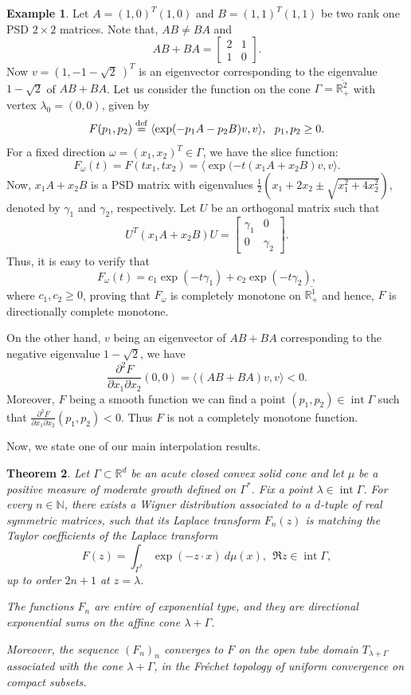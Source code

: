 \documentclass[11pt,reqno]{amsart}
\theoremstyle{plain}
\newtheorem{theorem}{Theorem}[section]
\theoremstyle{definition}
\newtheorem{example}[theorem]{Example}
\numberwithin{equation}{section}
\newcommand{\bydef}{\stackrel{\rm def}{=}}
\begin{document}
\begin{example} 
    Let $A=(1, 0)^T (1, 0)$ and $B=(1, 1)^T (1, 1)$ be two rank one PSD $2 \times 2$ matrices. Note that, $AB \neq BA$ and 
    $$AB+BA = \begin{bmatrix}
        2 & 1 \\ 1& 0
    \end{bmatrix}.$$ Now $v=(1, -1-\sqrt{2} \ )^T$ is an eigenvector corresponding to the eigenvalue $1-\sqrt{2}$ of $AB+BA$. Let us consider the function on the cone $\Gamma = \overline{\mathbb{R}^2_+}$ with vertex $\lambda_0 = (0, 0)$, given by
    $$
    F(p_1, p_2) \bydef \langle \exp(-p_1 A - p_2 B)v, v\rangle, \ \ p_1, p_2 \geq 0.
    $$
    For a fixed direction $\omega =(x_1, x_2)^T \in \Gamma$, we have the slice function:
$$
F_\omega(t) = F(t x_1, t x_2) = \langle \exp(-t(x_1 A + x_2 B)v, v\rangle.
$$
Now, $x_1A + x_2B$ is a PSD matrix with eigenvalues $\frac{1}{2}(x_1+ 2x_2 \pm \sqrt{x_1^2 + 4x_2^2})$, denoted by $\gamma_1$ and $\gamma_2$, respectively. Let $U$ be an orthogonal matrix such that 
$$U^T(x_1A + x_2B) U = \begin{bmatrix}
    \gamma_1 & 0\\ 0 & \gamma_2
\end{bmatrix}.$$
Thus, it is easy to verify that 
$$
F_\omega(t) = c_1 \exp(-t \gamma_1) + c_2 \exp(-t \gamma_2),
$$
where $c_1, c_2\geq 0$, proving that $F_\omega$ is completely monotone on $\overline{\mathbb{R}^1_+}$ and hence, $F$ is directionally complete monotone.

On the other hand, $v$ being an eigenvector of $AB+BA$ corresponding to the negative eigenvalue $1-\sqrt{2}$, we have
$$
\frac{\partial^2F}{\partial x_1 \partial x_2}(0, 0) =\langle (AB + BA)v, v \rangle < 0.
$$
Moreover, $F$ being a smooth function we can find a point $(p_1, p_2) \in \operatorname{int} \Gamma$ such that $\frac{\partial^2F}{\partial x_1 \partial x_2}(p_1, p_2) < 0.$ Thus $F$ is not a completely monotone function.
\end{example}

Now, we state one of our main interpolation results. 
	\begin{theorem}\label{th:Lap conv}
		Let $\Gamma \subset {\mathbb R}^d$ be an acute closed convex solid cone and let $\mu$ be a positive measure of moderate growth defined on $\Gamma^\ast$.
		Fix a point $\lambda \in \operatorname{int} \Gamma$. For every $n \in \mathbb{N}$, there exists a Wigner distribution associated 
		to a $d$-tuple of real symmetric matrices, such that its Laplace transform $F_n(z)$ is matching the Taylor coefficients of
		the Laplace transform
		$$ F(z) = \int_{\Gamma^\ast} \exp{(-z\cdot x)}\ d\mu(x), \ \ \Re z \in \operatorname{int} \Gamma,$$ 
        up to order $2n+1$ at $z = \lambda$. 
        
		The functions $F_n$ are entire of exponential type, and they are directional exponential sums on the affine cone $\lambda+\Gamma$. 
        
        Moreover, the sequence $(F_n)_n$ converges to $F$ on the open tube domain $T_{\lambda + \Gamma}$ associated with the cone $\lambda + \Gamma$, in the Fr\'echet topology of uniform convergence on compact subsets.
	\end{theorem}
    
\end{document}
